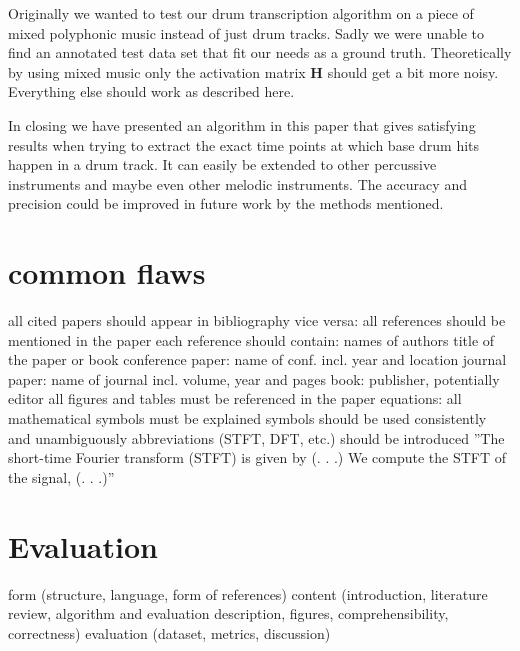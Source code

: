\documentclass{article}
\begin{document}
Originally we wanted to test our drum transcription algorithm on a piece of mixed polyphonic music instead of just drum tracks.
Sadly we were unable to find an annotated test data set that fit our needs as a ground truth.
Theoretically by using mixed music only the activation matrix $\mathbf{H}$ should get a bit more noisy.
Everything else should work as described here.

In closing we have presented an algorithm in this paper that gives satisfying results when trying to extract the exact time points at which base drum hits happen in a drum track.
It can easily be extended to other percussive instruments and maybe even other melodic instruments.
The accuracy and precision could be improved in future work by the methods mentioned.









\vfill\pagebreak

\section{common flaws}
all cited papers should appear in bibliography
vice versa: all references should be mentioned in the paper
each reference should contain:
names of authors
title of the paper or book
conference paper: name of conf. incl. year and location
journal paper: name of journal incl. volume, year and pages
book: publisher, potentially editor
all figures and tables must be referenced in the paper
equations:
all mathematical symbols must be explained
symbols should be used consistently and unambiguously
abbreviations (STFT, DFT, etc.) should be introduced
”The short-time Fourier transform (STFT) is given by (. . .)
We compute the STFT of the signal, (. . .)”

\section{Evaluation}

form (structure, language, form of references)
content (introduction, literature review, algorithm and
evaluation description, figures, comprehensibility, correctness)
evaluation (dataset, metrics, discussion)
\end{document}
